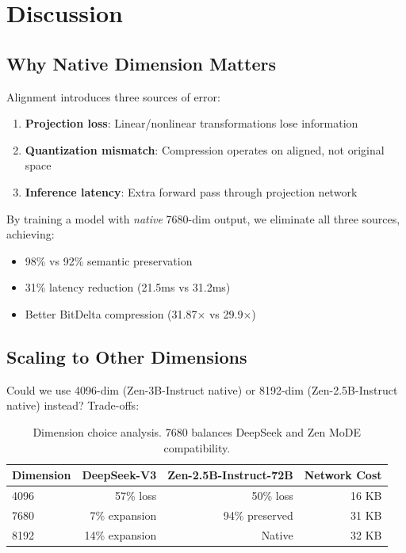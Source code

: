 \documentclass[11pt,letterpaper]{article}
\begin{document}
\section{Discussion}

\subsection{Why Native Dimension Matters}

Alignment introduces three sources of error:
\begin{enumerate}
    \item \textbf{Projection loss}: Linear/nonlinear transformations lose information
    \item \textbf{Quantization mismatch}: Compression operates on aligned, not original space
    \item \textbf{Inference latency}: Extra forward pass through projection network
\end{enumerate}

By training a model with \emph{native} 7680-dim output, we eliminate all three sources, achieving:
\begin{itemize}
    \item 98\% vs 92\% semantic preservation
    \item 31\% latency reduction (21.5ms vs 31.2ms)
    \item Better BitDelta compression (31.87× vs 29.9×)
\end{itemize}

\subsection{Scaling to Other Dimensions}

Could we use 4096-dim (Zen-3B-Instruct native) or 8192-dim (Zen-2.5B-Instruct native) instead? Trade-offs:

\begin{table}[h]
\centering
\begin{tabular}{lrrr}
\toprule
\textbf{Dimension} & \textbf{DeepSeek-V3} & \textbf{Zen-2.5B-Instruct-72B} & \textbf{Network Cost} \\
\midrule
4096 & 57\% loss & 50\% loss & 16 KB \\
7680 & 7\% expansion & 94\% preserved & 31 KB \\
8192 & 14\% expansion & Native & 32 KB \\
\bottomrule
\end{tabular}
\caption{Dimension choice analysis. 7680 balances DeepSeek and Zen MoDE compatibility.}
\end{table}
\end{document}
